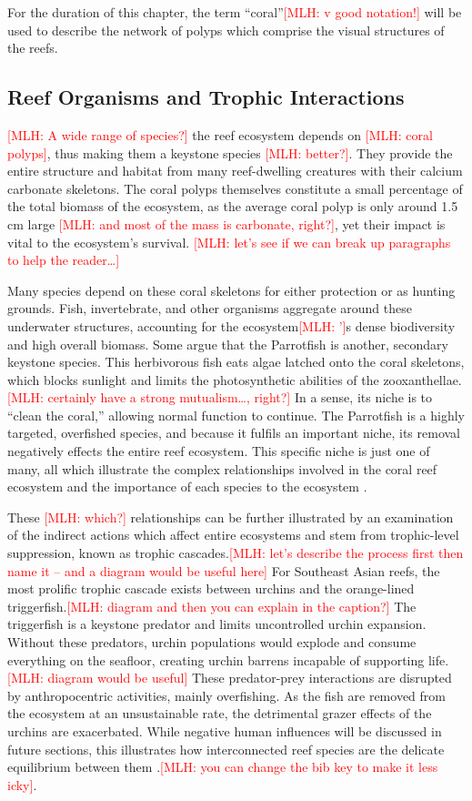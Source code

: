 \documentclass{book}\usepackage{knitr}
\newcommand{\red}[1]{\textcolor{red}{[MLH: #1]}}
\begin{document}
{For the duration of this chapter, the term ``coral''\red{v good notation!} will be used to describe the network of polyps which comprise the visual structures of the reefs. 

\subsection{Reef Organisms and Trophic Interactions}

\red{A wide range of species?} the reef ecosystem depends on \red{coral polyps}, thus making them a keystone species \red{better?}. They provide the entire structure and habitat from many reef-dwelling creatures with their calcium carbonate skeletons. The coral polyps themselves constitute a small percentage of the total biomass of the ecosystem, as the average coral polyp is only around 1.5 cm large \red{and most of the mass is carbonate, right?}, yet their impact is vital to the ecosystem's survival. \red{let's see if we can break up paragraphs to help the reader\ldots} 

Many species depend on these coral skeletons for either protection or as hunting grounds. Fish, invertebrate, and other organisms aggregate around these underwater structures, accounting for the ecosystem\red{’}s dense biodiversity and high overall biomass. Some argue that the Parrotfish is another, secondary keystone species. This herbivorous fish eats algae latched onto the coral skeletons, which blocks sunlight and limits the photosynthetic abilities of the zooxanthellae.\red{certainly have a strong mutualism\ldots, right?} In a sense, its niche is to ``clean the coral,'' allowing normal function to continue. The Parrotfish is a highly targeted, overfished species, and because it fulfils an important niche, its removal negatively effects the entire reef ecosystem. This specific niche is just one of many, all which illustrate the complex relationships involved in the coral reef ecosystem and the importance of each species to the ecosystem \citep{https://doi.org/10.1890/15-1492.1}. 

These \red{which?} relationships can be further illustrated by an examination of the indirect actions which affect entire ecosystems and stem from trophic-level suppression, known as trophic cascades.\red{let's describe the process first then name it -- and a diagram would be useful here} For Southeast Asian reefs, the most prolific trophic cascade exists between urchins and the orange-lined triggerfish.\red{diagram and then you can explain in the caption?} The triggerfish is a keystone predator and limits uncontrolled urchin expansion. Without these predators, urchin populations would explode and consume everything on the seafloor, creating urchin barrens incapable of supporting life.\red{diagram would be useful} These predator-prey interactions are disrupted by anthropocentric activities, mainly overfishing. As the fish are removed from the ecosystem at an unsustainable rate, the detrimental grazer effects of the urchins are exacerbated. While negative human influences will be discussed in future sections, this illustrates how interconnected reef species are the delicate equilibrium between them \citep{https://doi.org/10.1890/15-1492.1}.\red{you can change the bib key to make it less icky}.

}
\end{document}
